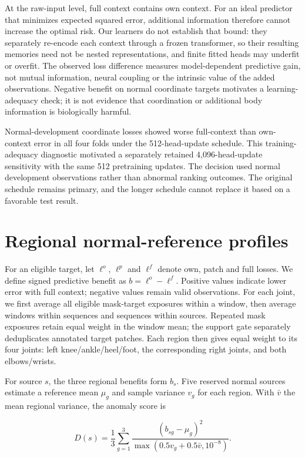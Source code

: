 \documentclass[letterpaper]{article}
\begin{document}
At the raw-input level, full context contains own context. For an ideal predictor that minimizes expected squared error, additional information therefore cannot increase the optimal risk. Our learners do not establish that bound: they separately re-encode each context through a frozen transformer, so their resulting memories need not be nested representations, and finite fitted heads may underfit or overfit. The observed loss difference measures model-dependent predictive gain, not mutual information, neural coupling or the intrinsic value of the added observations. Negative benefit on normal coordinate targets motivates a learning-adequacy check; it is not evidence that coordination or additional body information is biologically harmful.

Normal-development coordinate losses showed worse full-context than own-context error in all four folds under the 512-head-update schedule. This training-adequacy diagnostic motivated a separately retained 4,096-head-update sensitivity with the same 512 pretraining updates. The decision used normal development observations rather than abnormal ranking outcomes. The original schedule remains primary, and the longer schedule cannot replace it based on a favorable test result.

\section{Regional normal-reference profiles}

For an eligible target, let \(\ell^{o}\), \(\ell^{p}\) and \(\ell^{f}\) denote own, patch and full losses. We define signed predictive benefit as \(b=\ell^{o}-\ell^{f}\). Positive values indicate lower error with full context; negative values remain valid observations. For each joint, we first average all eligible mask-target exposures within a window, then average windows within sequences and sequences within sources. Repeated mask exposures retain equal weight in the window mean; the support gate separately deduplicates annotated target patches. Each region then gives equal weight to its four joints: left knee/ankle/heel/foot, the corresponding right joints, and both elbows/wrists.

For source \(s\), the three regional benefits form \(b_s\). Five reserved normal sources estimate a reference mean \(\mu_g\) and sample variance \(v_g\) for each region. With \(\bar v\) the mean regional variance, the anomaly score is

\[
D(s)=\frac{1}{3}\sum_{g=1}^{3}\frac{(b_{sg}-\mu_g)^2}{\max(0.5v_g+0.5\bar v,10^{-8})}.
\]
\end{document}
